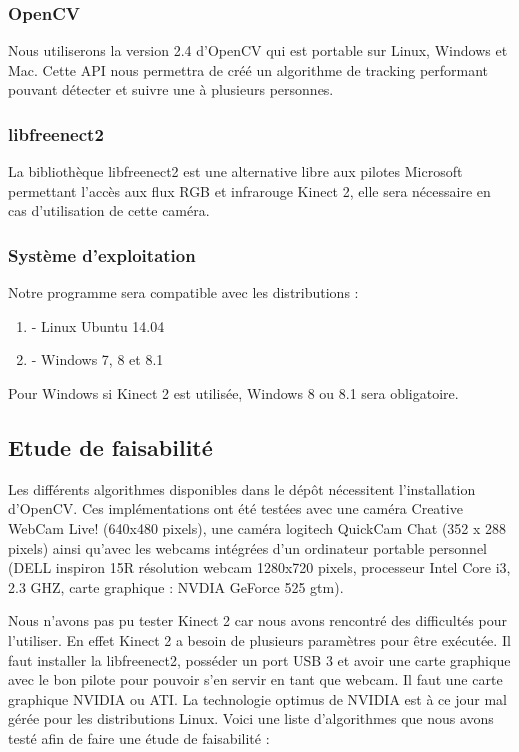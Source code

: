 \documentclass[12pt,a4paper]{article}
\begin{document}
\subsubsection{OpenCV}

Nous utiliserons la version 2.4 d'OpenCV qui est portable sur Linux, Windows et Mac. Cette API nous permettra de créé un algorithme de tracking performant pouvant détecter et suivre une à plusieurs personnes.

\subsubsection{libfreenect2}

La bibliothèque libfreenect2 est une alternative libre aux pilotes Microsoft permettant l'accès aux flux RGB et infrarouge Kinect 2, elle sera nécessaire en cas d'utilisation de cette caméra.


\subsubsection{Système d'exploitation}

Notre programme sera compatible avec les distributions : 
\begin{enumerate}
\item[] - Linux Ubuntu 14.04
\item[] - Windows 7, 8 et 8.1
\end{enumerate}
Pour Windows si Kinect 2 est utilisée, Windows 8 ou 8.1 sera obligatoire.

\subsection{Etude de faisabilité}
Les différents algorithmes disponibles dans le dépôt nécessitent l'installation d'OpenCV.
Ces implémentations ont été testées avec une caméra Creative WebCam Live! (640x480 pixels), une caméra logitech QuickCam Chat (352 x 288 pixels) ainsi qu'avec les webcams intégrées d'un ordinateur portable personnel (DELL inspiron 15R résolution webcam 1280x720 pixels, processeur Intel Core i3, 2.3 GHZ, carte graphique : NVDIA GeForce 525 gtm).

Nous n'avons pas pu tester Kinect 2 car nous avons rencontré des difficultés pour l'utiliser. En effet Kinect 2 a besoin de plusieurs paramètres pour être exécutée.
Il faut installer la libfreenect2, posséder un port USB 3 et avoir une carte graphique avec le bon pilote pour pouvoir s'en servir en tant que webcam.
Il faut une carte graphique NVIDIA ou ATI. La technologie optimus de NVIDIA est à ce jour mal gérée pour les distributions Linux. 
\newpage
Voici une liste d'algorithmes que nous avons testé afin de faire une étude de faisabilité : 
\end{document}
